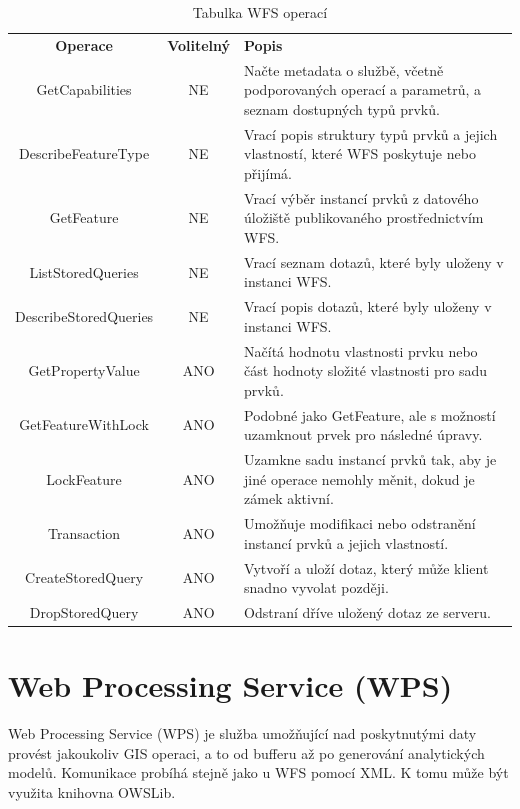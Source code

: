 \documentclass[a4paper,oneside,12pt]{book}
\begin{document}
\begin{table}[htbp]
  \centering
  \caption{Tabulka WFS operací} 
  \label{tab:WFS}
  \begin{tabular}{|c|c|p{7cm}|}
    \hline
    \textbf{Operace} & \textbf{Volitelný} & \textbf{Popis} \\
    \hhline{=|=|=}
    GetCapabilities & NE & Načte metadata o službě, včetně podporovaných operací a parametrů, a seznam dostupných typů prvků. \\
    \hline
    DescribeFeatureType & NE & Vrací popis struktury typů prvků a jejich vlastností, které WFS poskytuje nebo přijímá. \\
    \hline
    GetFeature & NE & Vrací výběr instancí prvků z datového úložiště publikovaného prostřednictvím WFS. \\
    \hline
    ListStoredQueries & NE & Vrací seznam dotazů, které byly uloženy v instanci WFS. \\
    \hline
    DescribeStoredQueries & NE & Vrací popis dotazů, které byly uloženy v instanci WFS. \\
    \hline
    GetPropertyValue & ANO & Načítá hodnotu vlastnosti prvku nebo část hodnoty složité vlastnosti pro sadu prvků. \\
    \hline
    GetFeatureWithLock & ANO & Podobné jako GetFeature, ale s možností uzamknout prvek pro následné úpravy. \\
    \hline
    LockFeature & ANO & Uzamkne sadu instancí prvků tak, aby je jiné operace nemohly měnit, dokud je zámek aktivní. \\
    \hline
    Transaction & ANO & Umožňuje modifikaci nebo odstranění instancí prvků a jejich vlastností. \\
    \hline
    CreateStoredQuery & ANO & Vytvoří a uloží dotaz, který může klient snadno vyvolat později. \\
    \hline
    DropStoredQuery & ANO & Odstraní dříve uložený dotaz ze serveru. \\
    \hline
  \end{tabular}
\end{table}

\section{Web Processing Service (WPS)} \label{wps}
Web Processing Service (WPS) je služba umožňující nad poskytnutými daty provést jakoukoliv GIS operaci, a to od bufferu až po generování analytických modelů. Komunikace probíhá stejně jako u WFS pomocí XML. K tomu může být využita knihovna OWSLib.
\end{document}
